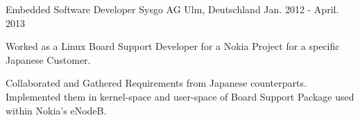   \cventry
    {Embedded Software Developer} %
    {Sysgo AG} %
    {Ulm, Deutschland} %
    {Jan. 2012 - April. 2013} %
    {
      \begin{cvitems} %
    \item {Worked as a Linux Board Support Developer for a Nokia Project for a specific Japanese Customer.}
	\item {Collaborated and Gathered Requirements from Japanese counterparts. Implemented them in kernel-space and user-space of Board Support Package  used within Nokia's eNodeB.}
       \end{cvitems}
    }
